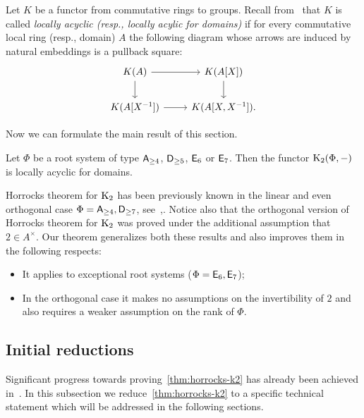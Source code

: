 \begin{dfn}
    Let $K$ be a functor from commutative rings to groups.
    Recall from~\cite{LSV2} that $K$ is called \textit{locally acyclic (resp., locally acylic for domains)} if for every commutative local ring (resp., domain) $A$ the following diagram whose arrows are induced by natural embeddings is a pullback square:
    \begin{equation}\label{eq:P1-square} \begin{tikzcd} K(A) \ar[r] \ar[d] & K(A[X]) \arrow{d} \\ K(A[X\inv]) \ar{r} & K(A[X, X\inv]). \end{tikzcd} \end{equation}
\end{dfn}

Now we can formulate the main result of this section.
\begin{thm}\label{thm:horrocks-k2}
Let $\Phi$ be a root system of type $\mathsf{A}_{\geq 4}$, $\mathsf{D}_{\geq 5}$, $\mathsf{E}_6$ or $\mathsf{E}_7$.
Then the functor $\operatorname{K}_{2}(\Phi, -)$ is locally acyclic for domains.
\end{thm}
Horrocks theorem for $\operatorname{K}_2$ has been previously known in the linear and even orthogonal case $\Phi=\mathsf{A}_{\geq 4},\mathsf{D}_{\geq 7}$, see~\cite[Theorem~1]{LS20},\cite[Proposition~4.3]{Tu83}.
Notice also that the orthogonal version of Horrocks theorem for $\operatorname{K}_2$ was proved under the additional assumption that $2 \in A^\times$.
Our theorem generalizes both these results and also improves them in the following respects:
\begin{itemize}
    \item It applies to exceptional root systems ($\Phi = \mathsf{E}_6, \mathsf{E}_7$);
    \item In the orthogonal case it makes no assumptions on the invertibility of $2$ and also requires a weaker assumption on the rank of $\Phi$.
\end{itemize}

\subsection{Initial reductions} \label{subsec:structure-theorem-overview}
Significant progress towards proving~\cref{thm:horrocks-k2} has already been achieved in~\cite{LS20}.
In this subsection we reduce~\cref{thm:horrocks-k2} to a specific technical statement which will be addressed in the following sections.

